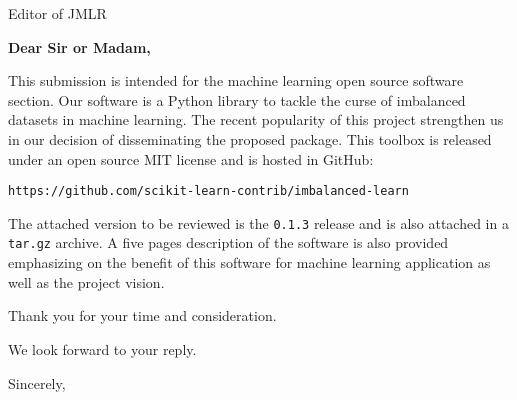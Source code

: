 \documentclass{letter}
\begin{document}

\begin{letter}{Editor of JMLR} %


\opening{\textbf{Dear Sir or Madam,}}

This submission is intended for the machine learning open source software section.
Our software is a Python library to tackle the curse of imbalanced datasets in machine learning.
The recent popularity of this project strengthen us in our decision of disseminating the proposed package. 
This toolbox is released under an open source MIT license and is hosted in GitHub:

\texttt{https://github.com/scikit-learn-contrib/imbalanced-learn}

The attached version to be reviewed is the \texttt{0.1.3} release and is also attached in a \texttt{tar.gz} archive.
A five pages description of the software is also provided emphasizing on the benefit of this software for machine learning application as well as the project vision.

Thank you for your time and consideration.

We look forward to your reply.

\vspace{2\parskip} %
\closing{Sincerely,}
\vspace{2\parskip} %


\end{letter}
 
\end{document}
